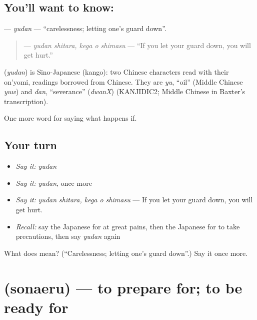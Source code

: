 \subsection*{You'll want to know: }
\textbf{} — \emph{yudan} — \textquotedblleft{}carelessness; letting one's guard down\textquotedblright{}.

\begin{quote}
\textbf{ } — \emph{yudan shitara, kega o shimasu} — \textquotedblleft{}If you let your guard down, you will get hurt.\textquotedblright{}
\end{quote}

\begin{cousinweb}
\textbf{} (\emph{yudan}) is Sino-Japanese (kango): two Chinese characters read with their on'yomi, readings borrowed from Chinese. They are \emph{yu}, \textquotedblleft{}oil\textquotedblright{} (Middle Chinese \emph{yuw}) and \emph{dan}, \textquotedblleft{}severance\textquotedblright{} (\emph{dwanX}) (KANJIDIC2; Middle Chinese in Baxter's transcription).
\end{cousinweb}

\begin{grammarlens}[title={What you've built}]
One more word for saying what happens if.
\end{grammarlens}

\subsection*{Your turn}
\begin{itemize}
\raggedright
  \item \emph{Say it:} \emph{yudan}
  \item \emph{Say it:} \emph{yudan}, once more
  \item \emph{Say it:} \emph{yudan shitara, kega o shimasu} — If you let your guard down, you will get hurt.
  \item \emph{Recall:} say the Japanese for at great pains, then the Japanese for to take precautions, then say \emph{yudan} again
\end{itemize}

\begin{tcolorbox}[breakable,colback=teal!4,colframe=teal!35!black,title={Before you move on}]
What does  mean? (\textquotedblleft{}Carelessness; letting one's guard down\textquotedblright{}.) Say it once more.
\end{tcolorbox}
\section[\texorpdfstring{\ja{そなえる} (sonaeru)}{そなえる (sonaeru)}]{ (sonaeru) — to prepare for; to be ready for}


